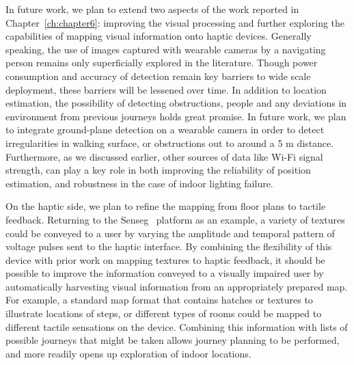 In future work, we plan to extend two aspects of the work reported in Chapter~\ref{ch:chapter6}: improving the visual processing and further exploring the capabilities of mapping visual information onto haptic devices. Generally speaking, the use of images captured with wearable cameras by a navigating person remains only superficially explored in the literature. Though power consumption and accuracy of detection remain key barriers to wide scale deployment, these barriers will be lessened over time. In addition to location estimation, the possibility of detecting obstructions, people and any deviations in environment from previous journeys holds great promise. In future work, we plan to integrate ground-plane detection on a wearable camera in order to detect irregularities in walking surface, or obstructions out to around a 5 m distance. Furthermore, as we discussed earlier, other sources of data like Wi-Fi signal strength, can play a key role in both improving the reliability of position estimation, and robustness in the case of indoor lighting failure.

On the haptic side, we plan to refine the mapping from floor plans to tactile feedback. Returning to the Senseg\texttrademark~ platform as an example, a variety of textures could be conveyed to a user by varying the amplitude and temporal pattern of voltage pulses sent to the haptic interface. By combining the flexibility of this device with prior work on mapping textures to haptic feedback, it should be possible to improve the information conveyed to a visually impaired user by automatically harvesting visual information from an appropriately prepared map. For example, a standard map format that contains hatches or textures to illustrate locations of steps, or different types of rooms could be mapped to different tactile sensations on the device. Combining this information with lists of possible journeys that might be taken allows journey planning to be performed, and more readily opens up exploration of indoor locations.


